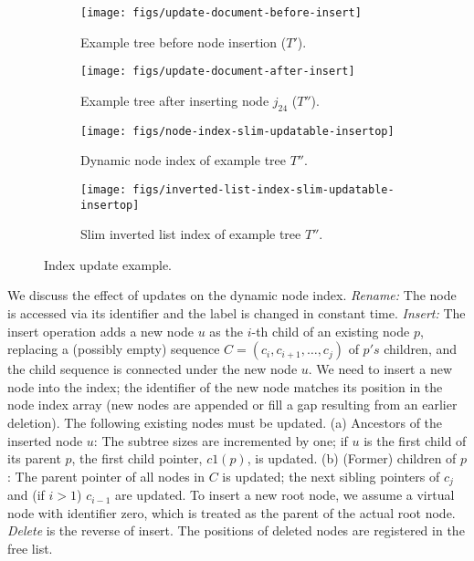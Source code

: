 \begin{figure}[ht!]
  \centering
  \begin{subfigure}[b]{0.45\textwidth}
    \centering
    \texttt{[image: figs/update-document-before-insert]}
    \caption{Example tree before node insertion ($T'$).}
    \label{fig:document-before-update}
  \end{subfigure}
  \begin{subfigure}[b]{0.45\textwidth}
    \centering
    \texttt{[image: figs/update-document-after-insert]}
    \caption{Example tree after inserting node $j_{24}$ ($T''$).}
    \label{fig:document-after-update}
  \end{subfigure}
  \begin{subfigure}[b]{0.45\textwidth}
    \texttt{[image: figs/node-index-slim-updatable-insertop]}
    \caption{Dynamic node index of example tree $T''$.}
  \end{subfigure}
  \begin{subfigure}[b]{0.45\textwidth}
    \texttt{[image: figs/inverted-list-index-slim-updatable-insertop]}
    \caption{Slim inverted list index of example tree $T''$.}
    \label{fig:inverted-lists-after-update}
  \end{subfigure}
  \caption{Index update example.}
  \label{fig:updated-node-index}
\end{figure}

We discuss the effect of updates on the dynamic node index. \emph{Rename:} The node is accessed via its identifier and the label is changed in constant time. \emph{Insert:} The insert operation adds a new node $u$ as the $i$-th child of an existing node $p$, replacing a (possibly empty) sequence $C = \left( c_i, c_{i + 1}, \ldots, c_j \right)$ of $p's$ children, and the child sequence is connected under the new node $u$. We need to insert a new node into the index; the identifier of the new node matches its position in the node index array (new nodes are appended or fill a gap resulting from an earlier deletion). The following existing nodes must be updated. (a) Ancestors of the inserted node $u$: The subtree sizes are incremented by one; if $u$ is the first child of its parent $p$, the first child pointer, $c1 \left( p \right)$, is updated. (b) (Former) children of $p$: The parent pointer of all nodes in $C$ is updated; the next sibling pointers of $c_j$ and (if $i > 1$) $c_{i - 1}$ are updated. To insert a new root node, we assume a virtual node with identifier zero, which is treated as the parent of the actual root node. \emph{Delete} is the reverse of insert. The positions of deleted nodes are registered in the free list.

